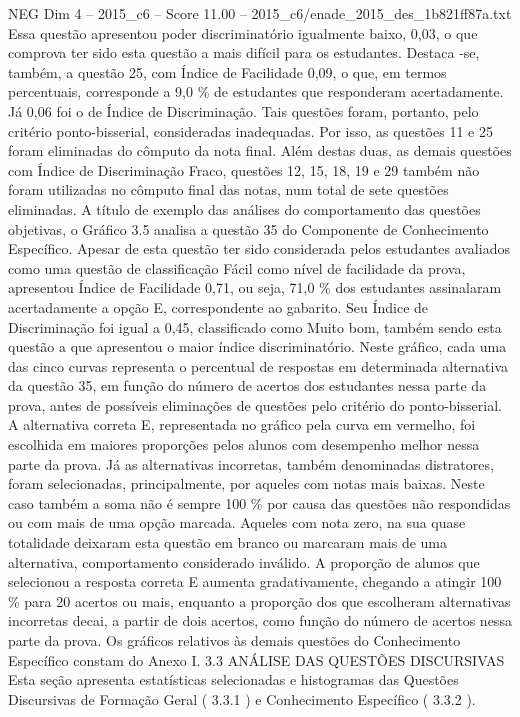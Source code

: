 \begin{textsample}{NEG Dim 4 – 2015\_c6 – Score 11.00 – 2015\_c6/enade\_2015\_des\_1b821ff87a.txt}
Essa questão apresentou poder discriminatório igualmente baixo, 0,03, o que comprova ter sido esta questão a mais difícil para os estudantes.
Destaca -se, também, a questão 25, com Índice de Facilidade 0,09, o que, em termos percentuais, corresponde a 9,0 \% de estudantes que responderam acertadamente.
Já 0,06 foi o de Índice de Discriminação.
Tais questões foram, portanto, pelo critério ponto-bisserial, consideradas inadequadas.
Por isso, as questões 11 e 25 foram eliminadas do cômputo da nota final.
Além destas duas, as demais questões com Índice de Discriminação Fraco, questões 12, 15, 18, 19 e 29 também não foram utilizadas no cômputo final das notas, num total de sete questões eliminadas.
A título de exemplo das análises do comportamento das questões objetivas, o Gráfico 3.5 analisa a questão 35 do Componente de Conhecimento Específico.
Apesar de esta questão ter sido considerada pelos estudantes avaliados como uma questão de classificação Fácil como nível de facilidade da prova, apresentou Índice de Facilidade 0,71, ou seja, 71,0 \% dos estudantes assinalaram acertadamente a opção E, correspondente ao gabarito.
Seu Índice de Discriminação foi igual a 0,45, classificado como Muito bom, também sendo esta questão a que apresentou o maior índice discriminatório.
Neste gráfico, cada uma das cinco curvas representa o percentual de respostas em determinada alternativa da questão 35, em função do número de acertos dos estudantes nessa parte da prova, antes de possíveis eliminações de questões pelo critério do ponto-bisserial.
A alternativa correta E, representada no gráfico pela curva em vermelho, foi escolhida em maiores proporções pelos alunos com desempenho melhor nessa parte da prova.
Já as alternativas incorretas, também denominadas distratores, foram selecionadas, principalmente, por aqueles com notas mais baixas.
Neste caso também a soma não é sempre 100 \% por causa das questões não respondidas ou com mais de uma opção marcada.
Aqueles com nota zero, na sua quase totalidade deixaram esta questão em branco ou marcaram mais de uma alternativa, comportamento considerado inválido.
A proporção de alunos que selecionou a resposta correta E aumenta gradativamente, chegando a atingir 100 \% para 20 acertos ou mais, enquanto a proporção dos que escolheram alternativas incorretas decai, a partir de dois acertos, como função do número de acertos nessa parte da prova.
Os gráficos relativos às demais questões do Conhecimento Específico constam do Anexo I. 3.3 ANÁLISE DAS QUESTÕES DISCURSIVAS Esta seção apresenta estatísticas selecionadas e histogramas das Questões Discursivas de Formação Geral ( 3.3.1 ) e Conhecimento Específico ( 3.3.2 ).

\end{textsample}

